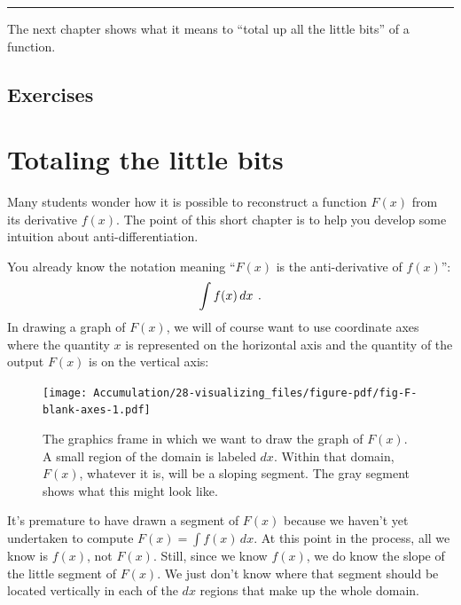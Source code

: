 \documentclass[
  letterpaper,
  DIV=11,
  numbers=noendperiod,
  oneside]{scrreprt}
\begin{document}
\begin{center}\rule{0.5\linewidth}{0.5pt}\end{center}

The next chapter shows what it means to ``total up all the little bits''
of a function.

\hypertarget{exercises}{%
\section{Exercises}\label{exercises}}

\hypertarget{sec-totaling-bits}{%
\chapter{Totaling the little bits}\label{sec-totaling-bits}}

Many students wonder how it is possible to reconstruct a function
\(F(x)\) from its derivative \(f(x)\). The point of this short chapter
is to help you develop some intuition about anti-differentiation.

You already know the notation meaning ``\(F(x)\) is the anti-derivative
of \(f(x)\)'': \[\large \int f(x)\, dx\ .\] In drawing a graph of
\(F(x)\), we will of course want to use coordinate axes where the
quantity \(x\) is represented on the horizontal axis and the quantity of
the output \(F(x)\) is on the vertical axis:

\begin{figure}

{\centering \texttt{[image: Accumulation/28-visualizing\_files/figure-pdf/fig-F-blank-axes-1.pdf]}

}

\caption{\label{fig-F-blank-axes}The graphics frame in which we want to
draw the graph of \(F(x)\). A small region of the domain is labeled
\(dx\). Within that domain, \(F(x)\), whatever it is, will be a sloping
segment. The gray segment shows what this might look like.}

\end{figure}

It's premature to have drawn a segment of \(F(x)\) because we haven't
yet undertaken to compute \(F(x) = \int f(x)\, dx\). At this point in
the process, all we know is \(f(x)\), not \(F(x)\). Still, since we know
\(f(x)\), we do know the slope of the little segment of \(F(x)\). We
just don't know where that segment should be located vertically in each
of the \(dx\) regions that make up the whole domain.
\end{document}
